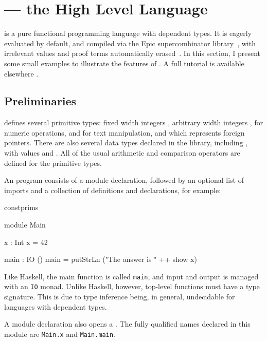 \section{\Idris{} --- the High Level Language}

\label{sect:hll}

\Idris{} is
a pure functional programming language with dependent types. It is
eagerly evaluated by default, and compiled via the Epic supercombinator
library~\cite{brady2011epic}, with irrelevant values and proof terms
automatically erased~\cite{Brady2003,Brady2005}.
In this section, I present some small examples to illustrate
the features of \Idris{}.
A full tutorial is available elsewhere \cite{idristutorial}. 

\subsection{Preliminaries}

\Idris{} defines several primitive types: fixed width integers
, arbitrary width integers ,
 for numeric operations,  and  for
text manipulation, and  which represents foreign pointers.
There are also several data types declared in the library, including
, with values  and . All of the usual
arithmetic and comparison operators are defined for the primitive types.

An \Idris{} program consists of a module declaration, followed by an optional
list of imports and a collection of definitions and declarations, for example:

\begin{SaveVerbatim}{constprims}

module Main

x : Int
x = 42

main : IO ()
main = putStrLn ("The answer is " ++ show x)

\end{SaveVerbatim}

\noindent
Like Haskell, the main function is called \texttt{main}, and input and output
is managed with an \texttt{IO} monad. Unlike Haskell, however,  
top-level functions must have a type signature. This is due to type inference
being, in general, undecidable for languages with dependent types.

A module declaration also opens a . The fully qualified names
declared in this module are \texttt{Main.x} and \texttt{Main.main}.

